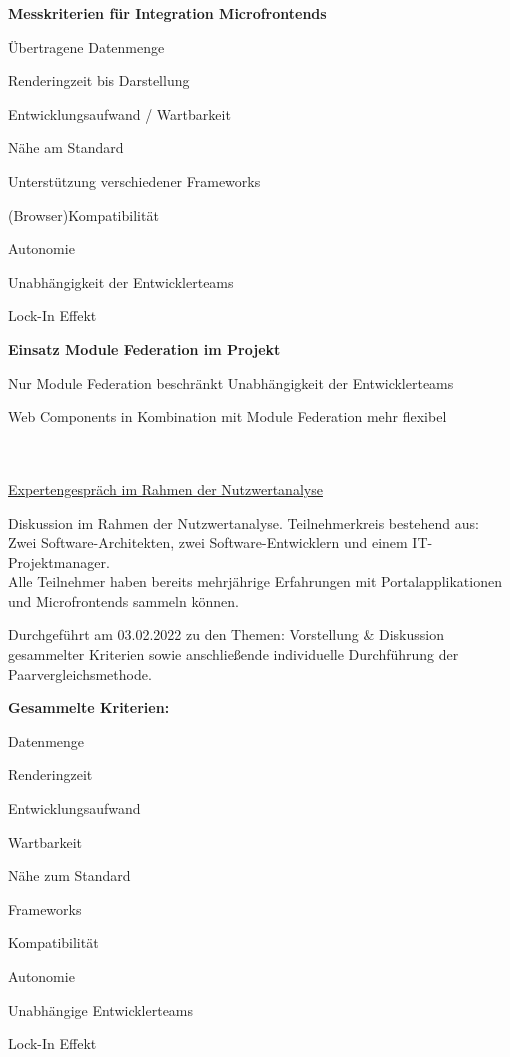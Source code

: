\textbf{Messkriterien für Integration Microfrontends} 
\begin{compactitem}
	\item Übertragene Datenmenge
	\item Renderingzeit bis Darstellung
	\item Entwicklungsaufwand / Wartbarkeit
	\item Nähe am Standard
	\item Unterstützung verschiedener Frameworks
	\item (Browser)Kompatibilität
	\item Autonomie
	\item Unabhängigkeit der Entwicklerteams
	\item Lock-In Effekt	
\end{compactitem}

\textbf{Einsatz Module Federation im Projekt} 
\begin{compactitem}
	\item Nur Module Federation beschränkt Unabhängigkeit der Entwicklerteams
	\item Web Components in Kombination mit Module Federation mehr flexibel
\end{compactitem}

\newpage
{}\\ \\
\underline{Expertengespräch im Rahmen der Nutzwertanalyse}

Diskussion im Rahmen der Nutzwertanalyse. Teilnehmerkreis bestehend aus:\\
Zwei Software-Architekten, zwei Software-Entwicklern und einem IT-Projektmanager.\\
Alle Teilnehmer haben bereits mehrjährige Erfahrungen mit Portalapplikationen und Microfrontends sammeln können.

Durchgeführt am 03.02.2022 zu den Themen: Vorstellung \& Diskussion gesammelter Kriterien sowie anschließende individuelle Durchführung der Paarvergleichsmethode. 

\textbf{Gesammelte Kriterien:}
\begin{compactitem}
	\item Datenmenge
	\item Renderingzeit
	\item Entwicklungsaufwand
	\item Wartbarkeit
	\item Nähe zum Standard
	\item Frameworks
	\item Kompatibilität
	\item Autonomie
	\item Unabhängige Entwicklerteams
	\item Lock-In Effekt
\end{compactitem}

